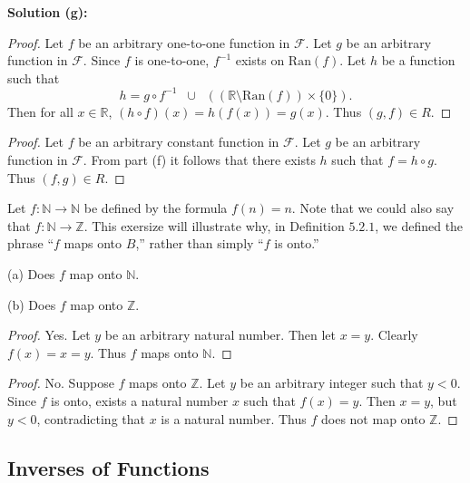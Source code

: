 \textbf{Solution (g):}

\begin{proof}
    Let $f$ be an arbitrary one-to-one function in $\mathcal{F}$.
    Let $g$ be an arbitrary function in $\mathcal{F}$.
    Since $f$ is one-to-one, $f^{-1}$ exists on $\mathrm{Ran}(f)$.
    Let $h$ be a function such that 
    \[
        h = g \circ f^{-1} \;\; \cup \;\; ((\mathbb{R} \setminus \mathrm{Ran}(f)) \times \{0\}).
    \]
    Then for all $x \in \mathbb{R}$, $(h \circ f)(x) = h(f(x)) = g(x)$.
    Thus $(g, f) \in R$.
\end{proof}


\begin{proof}
    Let $f$ be an arbitrary constant function in $\mathcal{F}$.
    Let $g$ be an arbitrary function in $\mathcal{F}$.
    From part (f) it follows that there exists $h$ 
        such that $f = h \circ g$.
    Thus $(f, g) \in R$.
\end{proof}

\begin{tcolorbox}[title=Problem 23, breakable]
    Let $f : \mathbb{N} \rightarrow \mathbb{N}$ be defined by the formula $f(n) = n$.
    Note that we could also say that $f : \mathbb{N} \rightarrow \mathbb{Z}$.
    This exersize will illustrate why,
        in Definition $5.2.1$, we defined the phrase ``$f$ maps onto $B$,''
        rather than simply ``$f$ is onto.''

    (a) Does $f$ map onto $\mathbb{N}$.

    (b) Does $f$ map onto $\mathbb{Z}$.
\end{tcolorbox}

\begin{proof}
    Yes. Let $y$ be an arbitrary natural number. Then let $x = y$.
    Clearly $f(x) = x = y$. Thus $f$ maps onto $\mathbb{N}$.
\end{proof}

\begin{proof}
    No. Suppose $f$ maps onto $\mathbb{Z}$.
    Let $y$ be an arbitrary integer such that $y < 0$.
    Since $f$ is onto, exists a natural number $x$ such that $f(x) = y$.
    Then $x = y$, but $y < 0$, contradicting
    that $x$ is a natural number. Thus $f$ does not map onto $\mathbb{Z}$.
\end{proof}

\subsection{Inverses of Functions}

